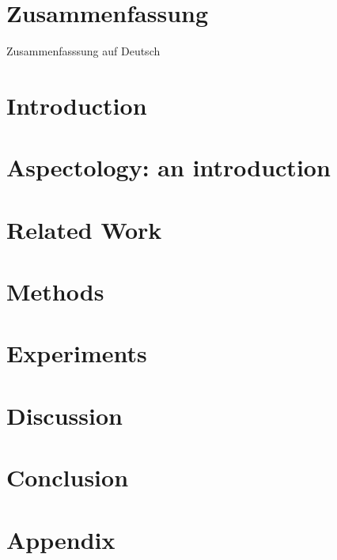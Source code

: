 \clearpage
\chapter*{Zusammenfassung}\label{c.zusammenfassung}
\foreignlanguage{ngerman}{
Zusammenfasssung auf Deutsch
}

\clearpage
\tableofcontents
\clearpage
\listoffigures
\clearpage
\listoftables

\clearpage
{} %
\chapter{Introduction}\label{c.introduction}


\chapter{Aspectology: an introduction}\label{c.aspectology}


\clearpage
\chapter{Related Work}\label{c.related}


\clearpage
\chapter{Methods}\label{c.methods}


\clearpage
\chapter{Experiments}\label{c.experiments}


\clearpage
\chapter{Discussion}\label{c.discussion}


\clearpage 
\chapter{Conclusion}\label{c.conclusion}


\clearpage
\appendix
\chapter{Appendix}


\clearpage
%



